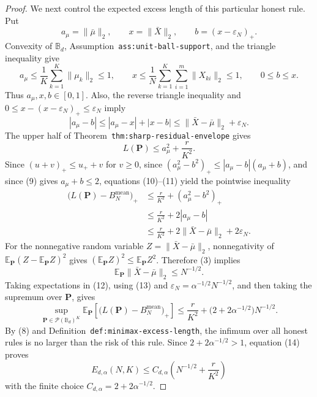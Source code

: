 \documentclass{article}
\begin{document}
\begin{proof}
We next control the expected excess length of this particular honest rule. Put
\[
a_\mu=\|\bar\mu\|_2,
\qquad
x=\|\bar X\|_2,
\qquad
b=(x-\varepsilon_N)_+.
\]
Convexity of \(\mathbb B_d\), Assumption~\texttt{ass:unit-ball-support}, and the triangle inequality give
\[
a_\mu\leq \frac1K\sum_{k=1}^K\|\mu_k\|_2\leq1,
\qquad
x\leq \frac1N\sum_{k=1}^K\sum_{i=1}^m\|X_{ki}\|_2\leq1,
\qquad
0\leq b\leq x. \tag{9}
\]
Thus \(a_\mu,x,b\in[0,1]\). Also, the reverse triangle inequality and \(0\leq x-(x-\varepsilon_N)_+\leq\varepsilon_N\) imply
\[
|a_\mu-b|
\leq |a_\mu-x|+|x-b|
\leq \|\bar X-\bar\mu\|_2+\varepsilon_N. \tag{10}
\]
The upper half of Theorem~\texttt{thm:sharp-residual-envelope} gives
\[
L(\mathbf P)\leq a_\mu^2+\frac r{K^2}. \tag{11}
\]
Since \((u+v)_+\leq u_++v\) for \(v\geq0\), since \((a_\mu^2-b^2)_+\leq |a_\mu-b|(a_\mu+b)\), and since (9) gives \(a_\mu+b\leq2\), equations (10)--(11) yield the pointwise inequality
\[
\begin{aligned}
\bigl(L(\mathbf P)-B_N^{\mathrm{mean}}\bigr)_+
&\leq \frac r{K^2}+(a_\mu^2-b^2)_+\\
&\leq \frac r{K^2}+2|a_\mu-b|\\
&\leq \frac r{K^2}
   +2\|\bar X-\bar\mu\|_2+2\varepsilon_N. \tag{12}
\end{aligned}
\]
For the nonnegative random variable \(Z=\|\bar X-\bar\mu\|_2\), nonnegativity of \(\mathbb E_{\mathbf P}(Z-\mathbb E_{\mathbf P}Z)^2\) gives \((\mathbb E_{\mathbf P}Z)^2\leq\mathbb E_{\mathbf P}Z^2\). Therefore (3) implies
\[
\mathbb E_{\mathbf P}\|\bar X-\bar\mu\|_2\leq N^{-1/2}. \tag{13}
\]
Taking expectations in (12), using (13) and \(\varepsilon_N=\alpha^{-1/2}N^{-1/2}\), and then taking the supremum over \(\mathbf P\), gives
\[
\sup_{\mathbf P\in\mathcal P(\mathbb B_d)^K}
\mathbb E_{\mathbf P}\!\left[\bigl(L(\mathbf P)-B_N^{\mathrm{mean}}\bigr)_+\right]
\leq \frac r{K^2}+\bigl(2+2\alpha^{-1/2}\bigr)N^{-1/2}. \tag{14}
\]
By (8) and Definition~\texttt{def:minimax-excess-length}, the infimum over all honest rules is no larger than the risk of this rule. Since \(2+2\alpha^{-1/2}>1\), equation (14) proves
\[
E_{d,\alpha}(N,K)
\leq C_{d,\alpha}\left(N^{-1/2}+\frac r{K^2}\right) \tag{15}
\]
with the finite choice \(C_{d,\alpha}=2+2\alpha^{-1/2}\).


\end{proof}
\end{document}
